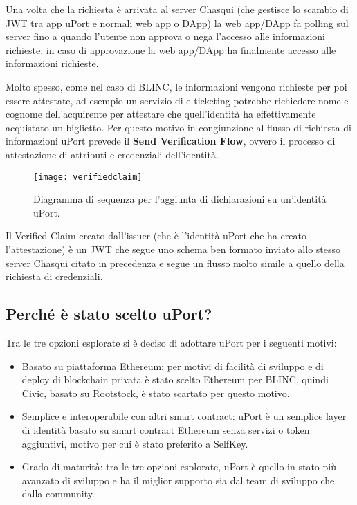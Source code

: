 Una volta che la richiesta è arrivata al server
Chasqui (che gestisce lo scambio di JWT tra app uPort e normali web app o DApp)
la web app/DApp fa polling sul server fino a quando l’utente non approva o nega
l’accesso alle informazioni richieste: in caso di approvazione la web app/DApp ha
finalmente accesso alle informazioni richieste.

Molto spesso, come nel caso di BLINC, le informazioni vengono richieste per poi essere
attestate, ad esempio un servizio di e-ticketing potrebbe
richiedere nome e cognome dell’acquirente per attestare che
quell’identità ha effettivamente acquistato un biglietto. Per questo motivo
in congiunzione al flusso di richiesta di informazioni uPort prevede il
\textbf{Send Verification Flow}, ovvero il processo di attestazione di attributi
e credenziali dell’identità.

\newpage

\begin{figure}[!ht]
    \texttt{[image: verifiedclaim]}
    \caption{Diagramma di sequenza per l'aggiunta di dichiarazioni su un'identità uPort.}
    \label{fig:verifiedclaim}
\end{figure}

Il Verified Claim creato dall’issuer (che è l’identità uPort che ha creato l’attestazione)
è un JWT che segue uno schema ben formato inviato allo stesso server Chasqui citato
in precedenza e segue un flusso molto simile a quello della richiesta di credenziali.

\subsection{Perché è stato scelto uPort?}

Tra le tre opzioni esplorate si è deciso di adottare uPort per i seguenti motivi:

\begin{itemize}
    \item Basato su piattaforma Ethereum: per motivi di facilità di sviluppo e di deploy di blockchain privata è stato scelto
    Ethereum per BLINC, quindi Civic, basato su Rootstock, è stato scartato per questo motivo.
    \item Semplice e interoperabile con altri smart contract: uPort è un semplice layer di identità basato su 
    smart contract Ethereum senza servizi o token aggiuntivi, motivo per cui è stato preferito a SelfKey.
    \item Grado di maturità: tra le tre opzioni esplorate, uPort è quello in stato più avanzato di sviluppo e ha il miglior supporto
    sia dal team di sviluppo che dalla community.
\end{itemize}

